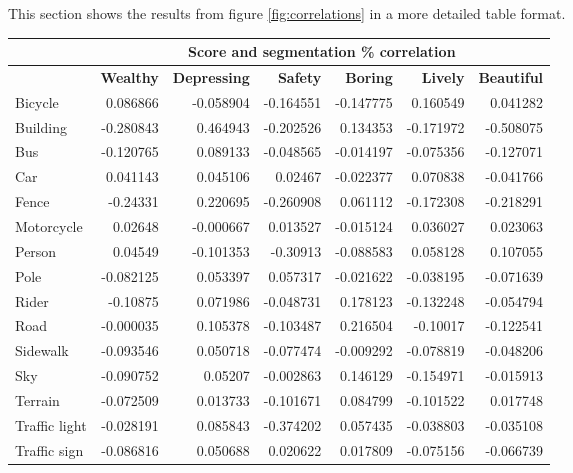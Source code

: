 This section shows the results from figure \ref{fig:correlations} in a more detailed table format.

\begin{table}[H]
    \begin{tabular}{|l|rrrrrr|}
    \hline
    & \multicolumn{6}{c|}{\textbf{Score and segmentation \% correlation}}              \\ \hline
    & \textbf{Wealthy}   & \textbf{Depressing} & \textbf{Safety}    & \textbf{Boring}    & \textbf{Lively}    & \textbf{Beautiful} \\ \hline
    Bicycle       & 0.086866  & -0.058904  & -0.164551 & -0.147775 & 0.160549  & 0.041282  \\
    Building      & -0.280843 & 0.464943   & -0.202526 & 0.134353  & -0.171972 & -0.508075 \\
    Bus           & -0.120765 & 0.089133   & -0.048565 & -0.014197 & -0.075356 & -0.127071 \\
    Car           & 0.041143  & 0.045106   & 0.02467   & -0.022377 & 0.070838  & -0.041766 \\
    Fence         & -0.24331  & 0.220695   & -0.260908 & 0.061112  & -0.172308 & -0.218291 \\
    Motorcycle    & 0.02648   & -0.000667  & 0.013527  & -0.015124 & 0.036027  & 0.023063  \\
    Person        & 0.04549   & -0.101353  & -0.30913  & -0.088583 & 0.058128  & 0.107055  \\
    Pole          & -0.082125 & 0.053397   & 0.057317  & -0.021622 & -0.038195 & -0.071639 \\
    Rider         & -0.10875  & 0.071986   & -0.048731 & 0.178123  & -0.132248 & -0.054794 \\
    Road          & -0.000035 & 0.105378   & -0.103487 & 0.216504  & -0.10017  & -0.122541 \\
    Sidewalk      & -0.093546 & 0.050718   & -0.077474 & -0.009292 & -0.078819 & -0.048206 \\
    Sky           & -0.090752 & 0.05207    & -0.002863 & 0.146129  & -0.154971 & -0.015913 \\
    Terrain       & -0.072509 & 0.013733   & -0.101671 & 0.084799  & -0.101522 & 0.017748  \\
    Traffic light & -0.028191 & 0.085843   & -0.374202 & 0.057435  & -0.038803 & -0.035108 \\
    Traffic sign  & -0.086816 & 0.050688   & 0.020622  & 0.017809  & -0.075156 & -0.066739 \\

\end{tabular}
\end{table}
